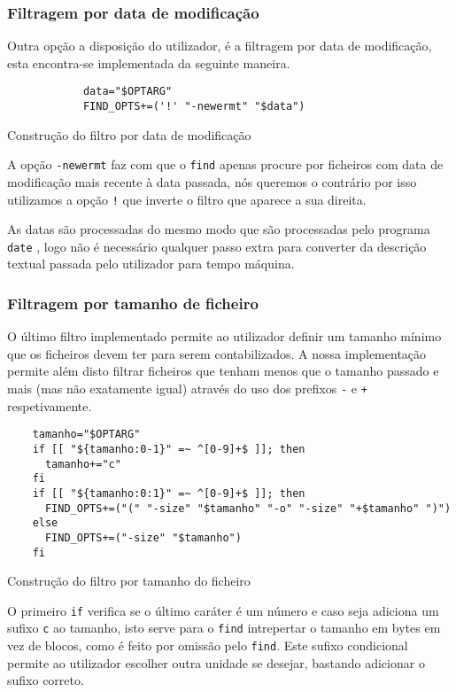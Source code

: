 \subsubsection{Filtragem por data de modificação}

Outra opção a disposição do utilizador, é a filtragem por data de modificação,
esta encontra-se implementada da seguinte maneira.

\begin{listing}[H]
	\centering
	\begin{verbatim}
			data="$OPTARG"
			FIND_OPTS+=('!' "-newermt" "$data")
  \end{verbatim}
	\caption{Construção do filtro por data de modificação}
\end{listing}

A opção \Verb|-newermt| faz com que o \Verb|find| apenas procure por ficheiros
com data de modificação mais recente à data passada, nós queremos o contrário por
isso utilizamos a opção \Verb|!| que inverte o filtro que aparece a sua direita.

As datas são processadas do mesmo modo que são processadas pelo programa
\Verb|date| \cite{find_man}, logo não é necessário qualquer passo extra para
converter da descrição textual passada pelo utilizador para tempo máquina.

\subsubsection{Filtragem por tamanho de ficheiro}

O último filtro implementado permite ao utilizador definir um tamanho mínimo que
os ficheiros devem ter para serem contabilizados. A nossa implementação permite
além disto filtrar ficheiros que tenham menos que o tamanho passado e mais (mas
não exatamente igual) através do uso dos prefixos \Verb|-| e \Verb|+|
respetivamente.

\begin{listing}[H]
	\centering
	\begin{verbatim}
    tamanho="$OPTARG"
    if [[ "${tamanho:0-1}" =~ ^[0-9]+$ ]]; then
      tamanho+="c"
    fi
    if [[ "${tamanho:0:1}" =~ ^[0-9]+$ ]]; then
      FIND_OPTS+=("(" "-size" "$tamanho" "-o" "-size" "+$tamanho" ")")
    else
      FIND_OPTS+=("-size" "$tamanho")
    fi
  \end{verbatim}
	\caption{Construção do filtro por tamanho do ficheiro}
\end{listing}

O primeiro \Verb|if| verifica se o último caráter é um número e caso seja
adiciona um sufixo \Verb|c| ao tamanho, isto serve para o \Verb|find|
intrepertar o tamanho em bytes em vez de blocos, como é feito por omissão pelo
\Verb|find|. Este sufixo condicional permite ao utilizador escolher outra
unidade se desejar, bastando adicionar o sufixo correto.

